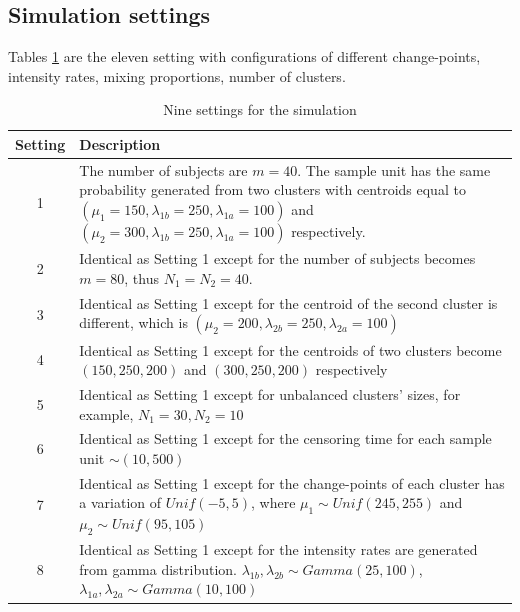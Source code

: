 \documentclass[12pt]{article}
\begin{document}
\subsection{Simulation settings}
Tables \ref{tab:setd} are the eleven setting with configurations of different change-points, intensity rates, mixing proportions, number of clusters.

\begin{table}[htp]
  \caption{\label{tab:setd}Nine settings for the simulation}
    \vspace{1ex}
 \centering
 \begin{tabular}{cl}
\hline
Setting&\multicolumn{1}{p{14.5cm}}{Description }\\ \hline
1 & \multicolumn{1}{p{14.5cm}}{The number of subjects are $m=40$. The sample unit has the same probability generated from two clusters with centroids equal to $(\mu_1=150,\lambda_{1b}=250,\lambda_{1a}=100)$ and $(\mu_2=300,\lambda_{1b}=250,\lambda_{1a}=100)$ respectively.}\\

2& \multicolumn{1}{p{14.5cm}}{Identical as Setting 1 except for the number of subjects becomes $m=80$, thus $N_1 = N_2 = 40$. }\\

3& \multicolumn{1}{p{14.5cm}}{Identical as Setting 1 except for the centroid of the second cluster is different, which is  $(\mu_2=200,\lambda_{2b}=250,\lambda_{2a}=100)$}\\

4& \multicolumn{1}{p{14.5cm}}{Identical as Setting 1 except for the centroids of two clusters become $(150,250,200)$ and $(300,250,200)$ respectively}\\

5& \multicolumn{1}{p{14.5cm}}{Identical as Setting 1  except for unbalanced clusters' sizes, for example, $N_1 = 30, N_2 = 10$}\\

6& \multicolumn{1}{p{14.5cm}}{Identical as Setting 1  except for the censoring time for each sample unit $ \sim (10, 500)$}\\

7& \multicolumn{1}{p{14.5cm}}{Identical as Setting 1  except for the change-points of each cluster has a variation of $Unif(-5, 5)$, where $\mu_1 \sim Unif(245, 255)$ and $\mu_2 \sim Unif(95, 105)$}\\

8& \multicolumn{1}{p{14.5cm}}{Identical as Setting 1  except for the intensity rates are generated from gamma distribution.  $\lambda_{1b},\lambda_{2b} \sim Gamma(25, 100)$, $\lambda_{1a},\lambda_{2a}\sim Gamma(10, 100)$ }\\


\end{tabular}
\end{table}
\end{document}
